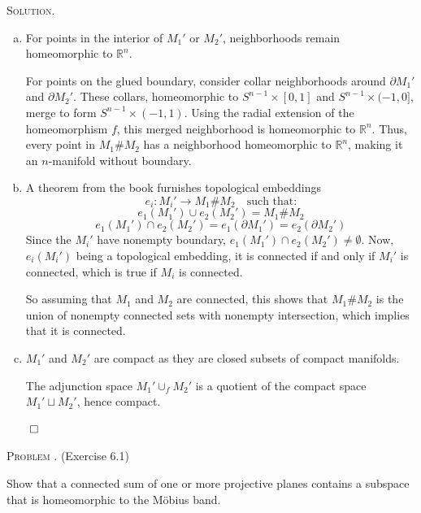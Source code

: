 \documentclass[12pt, a4paper, oneside]{ctexart}
\newcounter{problemname}
\newenvironment{problem}{\begin{framed}\stepcounter{problemname}\par\noindent\textsc{Problem \arabic{problemname}. }}{\end{framed}\par}
\newenvironment{solution}{%
	\par\noindent\textsc{Solution. }\ignorespaces
}{%
	\hfill$\qed$\par
}
\begin{document}
	\begin{solution}
		
        \begin{enumerate}[(a)]
            \item For points in the interior of $M_1'$ or $M_2'$, neighborhoods remain homeomorphic to $\mathbb{R}^n$.

                For points on the glued boundary, consider collar neighborhoods around $\partial M_1'$ and $\partial M_2'$. These collars, homeomorphic to $S^{n-1} \times [0,1]$ and $S^{n-1} \times (-1,0]$, merge to form $S^{n-1} \times (-1,1)$. Using the radial extension of the homeomorphism $f$, this merged neighborhood is homeomorphic to $\mathbb{R}^n$. Thus, every point in $M_1 \# M_2$ has a neighborhood homeomorphic to $\mathbb{R}^n$, making it an $n$-manifold without boundary.
            
            \item A theorem from the book furnishes topological embeddings 
                \[
                e_i : M_i' \to M_1 \# M_2 \quad \text{such that:}
                \]
                \[
                e_1(M_1') \cup e_2(M_2') = M_1 \# M_2
                \]
                \[
                e_1(M_1') \cap e_2(M_2') = e_1(\partial M_1') = e_2(\partial M_2')
                \]
                Since the $M_i'$ have nonempty boundary, $e_1(M_1') \cap e_2(M_2') \neq \emptyset$. Now, $e_i(M_i')$ being a topological embedding, it is connected if and only if $M_i'$ is connected, which is true if $M_i$ is connected.

                So assuming that $M_1$ and $M_2$ are connected, this shows that $M_1 \# M_2$ is the union of nonempty connected sets with nonempty intersection, which implies that it is connected.
            \item 
            $M_1'$ and $M_2'$ are compact as they are closed subsets of compact manifolds.

            The adjunction space $M_1' \cup_f M_2'$ is a quotient of the compact space $M_1' \sqcup M_2'$, hence compact.

        \end{enumerate}
        
		
	\end{solution}
	
	\begin{problem}
        (Exercise 6.1)

        Show that a connected sum of one or more projective planes contains 
        a subspace that is homeomorphic to the M\"obius band.
       
	\end{problem}
	
\end{document}
